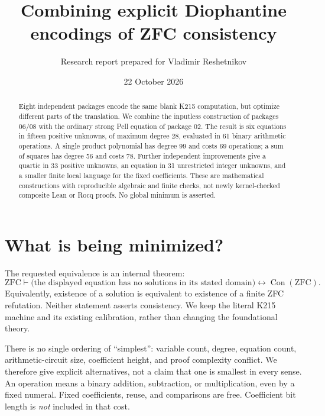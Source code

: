 \documentclass[11pt]{article}
\title{Combining explicit Diophantine encodings of ZFC consistency}
\author{Research report prepared for Vladimir Reshetnikov}
\date{22 October 2026}
\newcommand{\Con}{\operatorname{Con}}
\begin{document}
\maketitle
\begin{abstract}
Eight independent packages encode the same blank K215 computation, but optimize different parts of the translation. We combine the inputless construction of packages 06/08 with the ordinary strong Pell equation of package 02. The result is six equations in fifteen positive unknowns, of maximum degree 28, evaluated in 61 binary arithmetic operations. A single product polynomial has degree 99 and costs 69 operations; a sum of squares has degree 56 and costs 78. Further independent improvements give a quartic in 33 positive unknowns, an equation in 31 unrestricted integer unknowns, and a smaller finite local language for the fixed coefficients. These are mathematical constructions with reproducible algebraic and finite checks, not newly kernel-checked composite Lean or Rocq proofs. No global minimum is asserted.
\end{abstract}
\section{What is being minimized?}
The requested equivalence is an internal theorem:
\[
\mathrm{ZFC}\vdash
\bigl(\text{the displayed equation has no solutions in its stated domain}\bigr)
\longleftrightarrow\Con(\mathrm{ZFC}).
\]
Equivalently, existence of a solution is equivalent to existence of a finite ZFC refutation. Neither statement asserts consistency. We keep the literal K215 machine and its existing calibration, rather than changing the foundational theory.

There is no single ordering of ``simplest'': variable count, degree, equation count, arithmetic-circuit size, coefficient height, and proof complexity conflict. We therefore give explicit alternatives, not a claim that one is smallest in every sense. An operation means a binary addition, subtraction, or multiplication, even by a fixed numeral. Fixed coefficients, reuse, and comparisons are free. Coefficient bit length is \emph{not} included in that cost.
\end{document}
